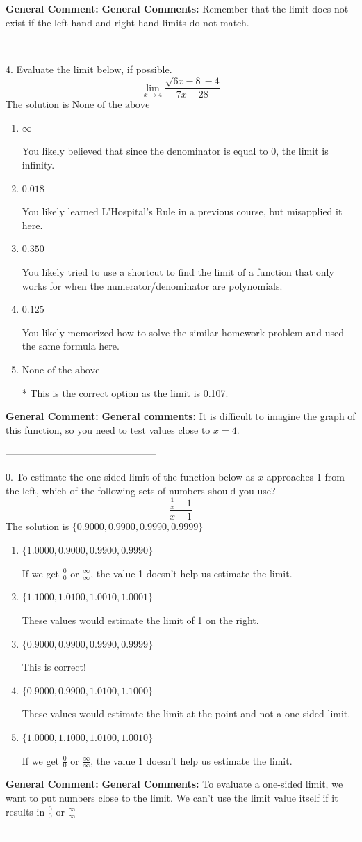 \documentclass{extbook}[14pt]
\begin{document}
\textbf{General Comment:} \textbf{General Comments:} Remember that the limit does not exist if the left-hand and right-hand limits do not match. 

-----------------------------------------------

4. Evaluate the limit below, if possible.
\[ \lim_{x \rightarrow 4} \frac{\sqrt{6x - 8} - 4}{7x - 28} \] 
The solution is $ \text{None of the above} $ 

\begin{enumerate}[label=\Alph*.] 
\item $ \infty $ 

 You likely believed that since the denominator is equal to 0, the limit is infinity. 
\item $ 0.018 $ 

 You likely learned L'Hospital's Rule in a previous course, but misapplied it here. 
\item $ 0.350 $ 

 You likely tried to use a shortcut to find the limit of a function that only works for when the numerator/denominator are polynomials. 
\item $ 0.125 $ 

 You likely memorized how to solve the similar homework problem and used the same formula here. 
\item $ \text{None of the above} $ 

 * This is the correct option as the limit is 0.107. 
\end{enumerate} 
 
\textbf{General Comment:} \textbf{General comments:} It is difficult to imagine the graph of this function, so you need to test values close to $x = 4$. 

-----------------------------------------------

0. To estimate the one-sided limit of the function below as $x$ approaches 1 from the left, which of the following sets of numbers should you use?
\[ \frac{\frac{1}{x} - 1}{x - 1} \] 
The solution is $ \{ 0.9000, 0.9900, 0.9990, 0.9999 \} $ 

\begin{enumerate}[label=\Alph*.] 
\item $ \{ 1.0000, 0.9000, 0.9900, 0.9990 \} $ 

 If we get $\frac{0}{0}$ or $\frac{\infty}{\infty}$, the value 1 doesn't help us estimate the limit. 
\item $ \{ 1.1000, 1.0100, 1.0010, 1.0001 \} $ 

 These values would estimate the limit of 1 on the right. 
\item $ \{ 0.9000, 0.9900, 0.9990, 0.9999 \} $ 

 This is correct! 
\item $ \{ 0.9000, 0.9900, 1.0100, 1.1000 \} $ 

 These values would estimate the limit at the point and not a one-sided limit. 
\item $ \{ 1.0000, 1.1000, 1.0100, 1.0010 \} $ 

 If we get $\frac{0}{0}$ or $\frac{\infty}{\infty}$, the value 1 doesn't help us estimate the limit. 
\end{enumerate} 
 
\textbf{General Comment:} \textbf{General Comments:} To evaluate a one-sided limit, we want to put numbers close to the limit. We can't use the limit value itself if it results in $\frac{0}{0}$ or $\frac{\infty}{\infty}$ 

-----------------------------------------------
\end{document}
